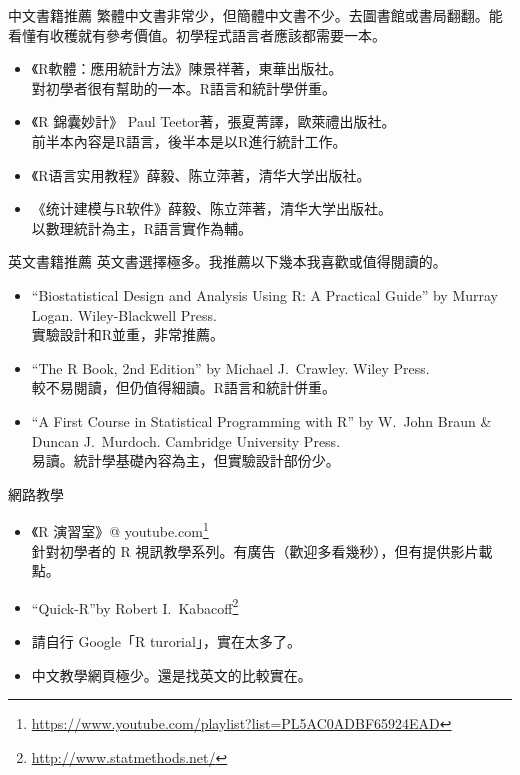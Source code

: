 \documentclass[12pt, aspectratio=43]{beamer}
\let\oldfootnote\footnote
\renewcommand\footnote[1]{\hspace{-0.3em}\oldfootnote{\ignorespaces#1}\hspace{0.3em}}
\begin{document}
\begin{frame}{中文書籍推薦}
繁體中文書非常少，但簡體中文書不少。去圖書館或書局翻翻。能看懂有收穫就有參考價值。初學程式語言者應該都需要一本。
\begin{itemize}
\item 《R軟體：應用統計方法》陳景祥著，東華出版社。\\ 對初學者很有幫助的一本。R語言和統計學併重。
\item 《R 錦囊妙計》 Paul Teetor著，張夏菁譯，歐萊禮出版社。\\ 前半本內容是R語言，後半本是以R進行統計工作。
\item {《R语言实用教程》薛毅、陈立萍著，清华大学出版社。}
\item {《统计建模与R软件》薛毅、陈立萍著，清华大学出版社。} \\ 以數理統計為主，R語言實作為輔。
\end{itemize}
\end{frame}

\begin{frame}{英文書籍推薦}
英文書選擇極多。我推薦以下幾本我喜歡或值得閱讀的。
\begin{itemize}
\item ``Biostatistical Design and Analysis Using R: A Practical Guide'' by Murray Logan. Wiley-Blackwell Press.\\ 實驗設計和R並重，非常推薦。
\item ``The R Book, 2nd Edition'' by Michael J.~Crawley. Wiley Press. \\ 較不易閱讀，但仍值得細讀。R語言和統計併重。
\item ``A First Course in Statistical Programming with R'' by W.~John Braun \& Duncan J.~Murdoch. Cambridge University Press. \\ 易讀。統計學基礎內容為主，但實驗設計部份少。
\end{itemize}
\end{frame}


\begin{frame}{網路教學}
\begin{itemize}
\item 《R 演習室》\makeatletter @ \makeatother youtube.com\oldfootnote{\url{https://www.youtube.com/playlist?list=PL5AC0ADBF65924EAD}} \\ 針對初學者的 R 視訊教學系列。有廣告（歡迎多看幾秒），但有提供影片載點。
\item ``Quick-R''by Robert I.~Kabacoff\oldfootnote{\url{http://www.statmethods.net/}}
\item 請自行 Google「R turorial」，實在太多了。
\item 中文教學網頁極少。還是找英文的比較實在。
\end{itemize}
\end{frame}
\end{document}
